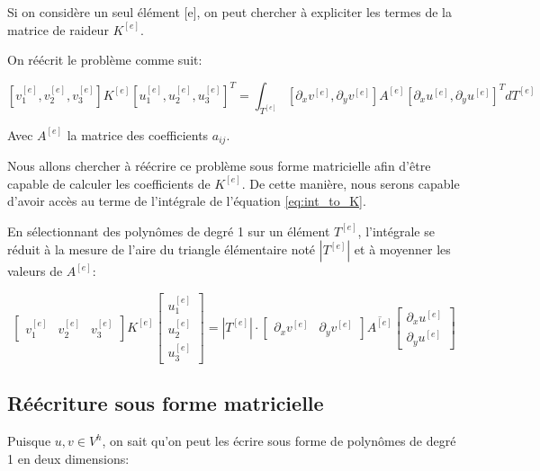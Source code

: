 \documentclass{article}
\begin{document}
Si on considère un seul élément [e], on peut chercher à expliciter
les termes de la matrice de raideur $K^{[e]}$.

On réécrit le problème comme suit:

\begin{equation}
    \left[ v_1^{[e]}, v_2^{[e]},  v_3^{[e]} \right] K^{[e]}
     \left[ u_1^{[e]}, u_2^{[e]}, u_3^{[e]} \right]^T
     = \int_{T^{[e]}} \left[\partial_x v^{[e]},
     \partial_y v^{[e]}\right] A^{[e]} \left[\partial_x u^{[e]},
     \partial_y u^{[e]}\right]^T dT^{[e]}
\end{equation}

Avec $A^{[e]}$ la matrice des coefficients $a_{ij}$.

Nous allons chercher à réécrire ce problème sous forme matricielle
afin d'être capable de calculer les coefficients de $K^{[e]}$.
De cette manière, nous serons capable d'avoir accès au terme
de l'intégrale de l'équation \ref{eq:int_to_K}.

En sélectionnant des polynômes de degré 1 sur un élément $T^{[e]}$,
l'intégrale se réduit à la mesure de l'aire du triangle élémentaire
noté $|T^{[e]}|$ et à moyenner les valeurs de $A^{[e]}$:

\begin{equation}
    \begin{bmatrix}
        v_1^{[e]} & v_2^{[e]} &  v_3^{[e]}
    \end{bmatrix}
    K^{[e]}
    \begin{bmatrix}
        u_1^{[e]} \\ u_2^{[e]} \\ u_3^{[e]}
    \end{bmatrix}
     = |T^{[e]}| \cdot
    \begin{bmatrix}
        \partial_x v^{[e]} & \partial_y v^{[e]}
    \end{bmatrix}
    \overline{A^{[e]}}
    \begin{bmatrix}
        \partial_x u^{[e]} \\ \partial_y u^{[e]}
    \end{bmatrix}
    \label{eq:vKu_eq}
\end{equation}

\subsection{Réécriture sous forme matricielle}

Puisque $u,v \in V^h$, on sait qu'on peut les écrire sous forme
de polynômes de degré 1 en deux dimensions:
\end{document}
